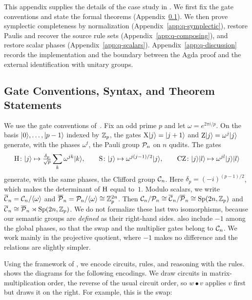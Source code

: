 \documentclass[acmsmall,screen,nonacm]{acmart}
\begin{document}
This appendix supplies the details of the case study in . We first fix the gate conventions and state the formal theorems (Appendix~\ref{app:q-circuits}). We then prove symplectic completeness by normalization (Appendix~\ref{app:q-symplectic}), restore Paulis and recover the source rule sets (Appendix~\ref{app:q-composing}), and restore scalar phases (Appendix~\ref{app:q-scalars}). Appendix~\ref{app:q-discussion} records the implementation and the boundary between the Agda proof and the external identification with unitary groups.

\subsection{Gate Conventions, Syntax, and Theorem Statements}\label{app:q-circuits}

We use the gate conventions of~\quditcite{}. Fix an odd prime $p$ and let $\omega = e^{2\pi i/p}$. On the basis $|0\rangle,\dots,|p-1\rangle$ indexed by $\mathbb{Z}_p$, the gates $\mathrm{X}|j\rangle = |j+1\rangle$ and $\mathrm{Z}|j\rangle = \omega^{j}|j\rangle$ generate, with the phases $\omega^t$, the Pauli group $\mathcal{P}_{n}$ on $n$ qudits. The gates
\[
\mathrm{H}\colon |j\rangle \mapsto \tfrac{\delta_p}{\sqrt p}\sum_k \omega^{jk}|k\rangle, \qquad
\mathrm{S}\colon |j\rangle \mapsto \omega^{j(j-1)/2}|j\rangle, \qquad
\mathrm{CZ}\colon |j\rangle|l\rangle \mapsto \omega^{jl}|j\rangle|l\rangle
\]
generate, with the same phases, the Clifford group $\mathcal{C}_{n}$. Here $\delta_p = (-i)^{(p-1)/2}$, which makes the determinant of $\mathrm{H}$ equal to~$1$. Modulo scalars, we write $\overline{\mathcal{C}}_{n} = \mathcal{C}_{n}/\langle\omega\rangle$ and $\overline{\mathcal{P}}_{n} = \mathcal{P}_{n}/\langle\omega\rangle \cong \mathbb{Z}_p^{2n}$. Then $\mathcal{C}_{n}/\mathcal{P}_{n} \cong \overline{\mathcal{C}}_{n}/\overline{\mathcal{P}}_{n} \cong \mathrm{Sp}(2n,\mathbb{Z}_p)$ and $\overline{\mathcal{C}}_{n} \cong \overline{\mathcal{P}}_{n} \rtimes \mathrm{Sp}(2n,\mathbb{Z}_p)$. We do not formalize these last two isomorphisms, because our semantic groups are \emph{defined} as their right-hand sides. \quditcite{} also include $-1$ among the global phases, so that the swap and the multiplier gates belong to $\mathcal{C}_{n}$. We work mainly in the projective quotient, where $-1$ makes no difference and the relations are slightly simpler.

Using the framework of , we encode circuits, rules, and reasoning with the rules.  shows the diagrams for the following encodings. We draw circuits in matrix-multiplication order, the reverse of the usual circuit order, so $w \bullet v$ applies $v$ first but draws it on the right. For example, this is the swap:


\end{document}
